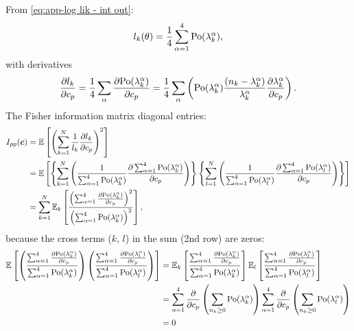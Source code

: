 From \autoref{eq:app-log lik - int out}:
%
\begin{equation}
	l_k(\theta)=\frac{1}{4}\sum_{\alpha=1}^4\mathrm{Po}(\lambda_k^\alpha),
\end{equation}
%
with derivatives 
%
\begin{equation}
	\frac{\partial l_k}{\partial c_p}=\frac{1}{4}\sum_\alpha\frac{\partial\mathrm{Po}(\lambda_k^\alpha)}{\partial c_p}=\frac{1}{4}\sum_\alpha\left(\mathrm{Po}(\lambda_k^\alpha)\frac{(n_k-\lambda_k^\alpha)}{\lambda_k^\alpha}\frac{\partial\lambda_k^\alpha}{\partial c_p}\right).
\end{equation}
%
The Fisher information matrix diagonal entries:
%
\begin{alignat}{2}
	I_{pp}(\bm{c}) & =\mathbb{E}\left[\left(\sum_{k=1}^N\frac{1}{l_k}\frac{\partial l_k}{\partial c_p}\right)^2\right]\nonumber \\
 	& =\mathbb{E}\left[\left\{ \sum_{k=1}^N\left(\frac{1}{\sum_{\alpha=1}^4\mathrm{Po}(\lambda_k^\alpha)}\frac{\partial\sum_{\alpha=1}^4\mathrm{Po}(\lambda_k^\alpha)}{\partial c_p}\right)\right\} \left\{ \sum_{l=1}^N\left(\frac{1}{\sum_{\alpha=1}^4\mathrm{Po}(\lambda_l^\alpha)}\frac{\partial\sum_{\alpha=1}^4\mathrm{Po}(\lambda_l^\alpha)}{\partial c_p}\right)\right\} \right]\nonumber \\
	& =\sum_{k=1}^N\mathbb{E}_k\left[\frac{\left(\sum_{\alpha=1}^4\frac{\partial\mathrm{Po}(\lambda_k^\alpha)}{\partial c_p}\right)^2}{\left(\sum_{\alpha=1}^4\mathrm{Po}(\lambda_k^\alpha)\right)^2}\right],
	\label{eq:app-Fisher Info Integrated Out - diagonal entries}
\end{alignat}
%
because the cross terms ($k,\, l$) in the sum (2nd row) are zeros: 
%
\begin{alignat*}{2}
	\mathbb{E}\left[\left(\frac{\sum_{\alpha=1}^4\frac{\partial\mathrm{Po}(\lambda_k^\alpha)}{\partial c_p}}{\sum_{\alpha=1}^4\mathrm{Po}(\lambda_k^\alpha)}\right)\left(\frac{\sum_{\alpha=1}^4\frac{\partial\mathrm{Po}(\lambda_l^\alpha)}{\partial c_p}}{\sum_{\alpha=1}^4\mathrm{Po}(\lambda_l^\alpha)}\right)\right] 
	& =\mathbb{E}_k\left[\frac{\sum_{\alpha=1}^4\frac{\partial\mathrm{Po}(\lambda_k^\alpha)}{\partial c_p}}{\sum_{\alpha=1}^4\mathrm{Po}(\lambda_k^\alpha)}\right]\mathbb{E}_l\left[\frac{\sum_{\alpha=1}^4\frac{\partial\mathrm{Po}(\lambda_l^\alpha)}{\partial c_p}}{\sum_{\alpha=1}^4\mathrm{Po}(\lambda_l^\alpha)}\right]\\
 	& =\sum_{\alpha=1}^4\frac{\partial}{\partial c_p}\left(\sum_{n_k\geq0}\mathrm{Po}(\lambda_k^\alpha)\right)\sum_{\alpha=1}^4\frac{\partial}{\partial c_p}\left(\sum_{n_k\geq0}\mathrm{Po}(\lambda_l^\alpha)\right)\\
 	& =0
\end{alignat*}

